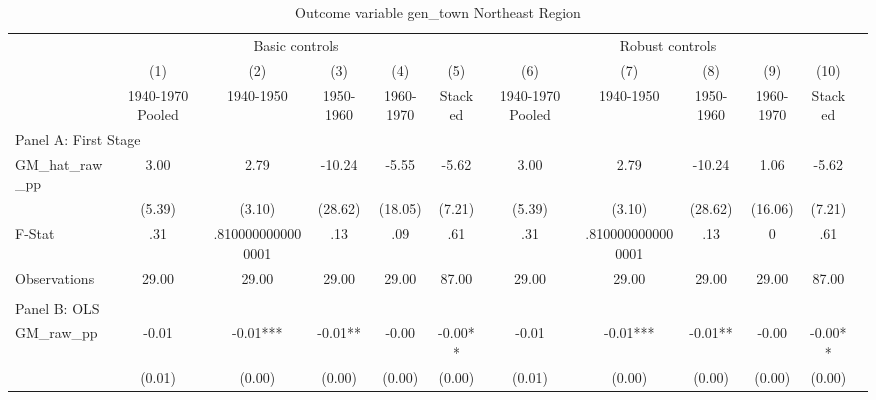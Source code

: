  \begin{table}[htbp]\centering {} \begin{threeparttable} \caption{Outcome variable gen\_town Northeast Region} \begin{tabular}{l*{11}{c}} \toprule
          &\multicolumn{5}{c}{Basic controls}                                   &\multicolumn{5}{c}{Robust controls}                                  \\\cmidrule(lr){2-6}\cmidrule(lr){7-11}
          &\multicolumn{1}{c}{(1)}&\multicolumn{1}{c}{(2)}&\multicolumn{1}{c}{(3)}&\multicolumn{1}{c}{(4)}&\multicolumn{1}{c}{(5)}&\multicolumn{1}{c}{(6)}&\multicolumn{1}{c}{(7)}&\multicolumn{1}{c}{(8)}&\multicolumn{1}{c}{(9)}&\multicolumn{1}{c}{(10)}\\
          &\multicolumn{1}{c}{1940-1970 Pooled}&\multicolumn{1}{c}{1940-1950}&\multicolumn{1}{c}{1950-1960}&\multicolumn{1}{c}{1960-1970}&\multicolumn{1}{c}{Stacked}&\multicolumn{1}{c}{1940-1970 Pooled}&\multicolumn{1}{c}{1940-1950}&\multicolumn{1}{c}{1950-1960}&\multicolumn{1}{c}{1960-1970}&\multicolumn{1}{c}{Stacked}\\
\cmidrule(lr){1-11}
\multicolumn{10}{l}{Panel A: First Stage}\\
\cmidrule(lr){1-11}
GM\_hat\_raw\_pp&      3.00   &      2.79   &    -10.24   &     -5.55   &     -5.62   &      3.00   &      2.79   &    -10.24   &      1.06   &     -5.62   \\
          &    (5.39)   &    (3.10)   &   (28.62)   &   (18.05)   &    (7.21)   &    (5.39)   &    (3.10)   &   (28.62)   &   (16.06)   &    (7.21)   \\
\midrule
F-Stat    &       .31   &.8100000000000001   &       .13   &       .09   &       .61   &       .31   &.8100000000000001   &       .13   &         0   &       .61   \\
Observations&     29.00   &     29.00   &     29.00   &     29.00   &     87.00   &     29.00   &     29.00   &     29.00   &     29.00   &     87.00   \\
\cmidrule[\heavyrulewidth](lr){1-11} \\ \cmidrule[\heavyrulewidth](lr){1-11}
\multicolumn{10}{l}{Panel B: OLS}\\
\cmidrule(lr){1-11}
GM\_raw\_pp &     -0.01   &     -0.01***&     -0.01** &     -0.00   &     -0.00** &     -0.01   &     -0.01***&     -0.01** &     -0.00   &     -0.00** \\
          &    (0.01)   &    (0.00)   &    (0.00)   &    (0.00)   &    (0.00)   &    (0.01)   &    (0.00)   &    (0.00)   &    (0.00)   &    (0.00)   \\

\end{tabular}
\end{threeparttable}
\end{table}
